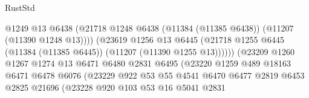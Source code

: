 \begin{lexlean}{RustStd}
\begin{coremodule}
                                            @1249
                                            @13
                                            @6438
                                            (@21718
                                              @1248
                                              @6438
                                              (@11384 (@11385 @6438))
                                              (@11207 (@11390 @1248 @13))))
                                          (@23619
                                            @1256
                                            @13
                                            @6445
                                            (@21718
                                              @1255
                                              @6445
                                              (@11384 (@11385 @6445))
                                              (@11207 (@11390 @1255 @13))))))
                                      (@23209
                                        @1260
                                        @1267
                                        @1274
                                        @13
                                        @6471
                                        @6480
                                        @2831
                                        @6495
                                        (@23220
                                          @1259
                                          @489
                                          @18163
                                          @6471
                                          @6478
                                          @6076
                                          (@23229
                                            @922
                                            @53
                                            @55
                                            @4541
                                            @6470
                                            @6477
                                            @2819
                                            @6453
                                            @2825
                                            @21696
                                            (@23228
                                              @920
                                              @103
                                              @53
                                              @16
                                              @5041
                                              @2831

\end{coremodule}
\end{lexlean}
